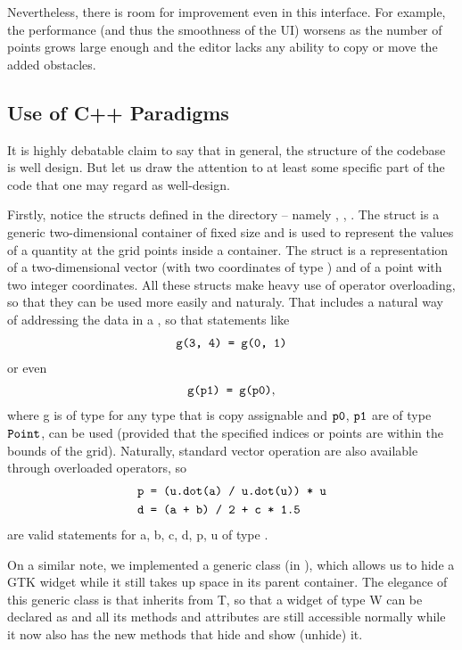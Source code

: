 \documentclass[11pt,a4paper,twoside,openright]{report}
\begin{document}
Nevertheless, there is room for improvement even in this interface. For example, the performance (and thus the smoothness of the UI) worsens as the number of points grows large enough and the editor lacks any ability to copy or move the added obstacles.

\subsection{Use of C++ Paradigms}
It is highly debatable claim to say that in general, the structure of the codebase is well design. But let us draw the attention to at least some specific part of the code that one may regard as well-design.

Firstly, notice the structs defined in the  directory -- namely , , . The  struct is a generic two-dimensional container of fixed size and is used to represent the values of a quantity at the grid points inside a container. The  struct is a representation of a two-dimensional vector (with two coordinates of type ) and  of a point with two integer coordinates. All these structs make heavy use of operator overloading, so that they can be used more easily and naturaly. That includes a natural way of addressing the data in a , so that statements like
\begin{align*}
	\texttt{g(3, 4) = g(0, 1)}
\end{align*}
or even
\begin{align*}
	\texttt{g(p1) = g(p0)},
\end{align*}
where \icd g is of type  for any type  that is copy assignable and $\texttt{p0}$, $\texttt{p1}$ are of type $\texttt{Point}$, can be used (provided that the specified indices or points are within the bounds of the grid). Naturally, standard vector operation are also available through overloaded operators, so
\begin{align*}
	&\texttt{p = (u.dot(a) / u.dot(u)) * u}\\
	&\texttt{d = (a + b) / 2 + c * 1.5}
\end{align*}
are valid statements for \icd a, \icd b, \icd c, \icd d, \icd p, \icd u of type .

On a similar note, we implemented a generic class  (in ), which allows us to hide a GTK widget while it still takes up space in its parent container. The elegance of this generic class is that  inherits from \icd T, so that a widget of type \icd W can be declared as  and all its methods and attributes are still accessible normally while it now also has the new methods that hide and show (unhide) it.
\end{document}
